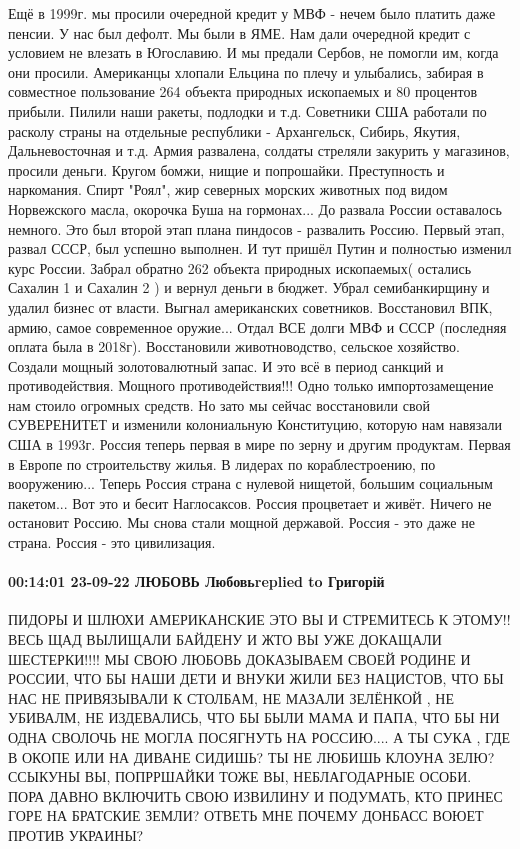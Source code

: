 Ещё в 1999г. мы просили очередной кредит у МВФ - нечем было платить даже пенсии.
У нас был дефолт.
Мы были в ЯМЕ.
Нам дали очередной кредит с условием не влезать в Югославию.
И мы предали Сербов, не помогли им, когда они просили.
Американцы хлопали Ельцина по плечу и улыбались, забирая в совместное пользование 264 объекта природных ископаемых и 80 процентов прибыли. Пилили наши ракеты, подлодки и т.д.
Советники США работали по расколу страны на отдельные республики - Архангельск, Сибирь, Якутия, Дальневосточная и т.д. Армия развалена, солдаты стреляли закурить у магазинов, просили деньги.
Кругом бомжи, нищие и попрошайки. Преступность и наркомания. Спирт "Роял", жир северных морских животных под видом Норвежского масла, окорочка Буша на гормонах...
До развала России оставалось немного.
Это был второй этап плана пиндосов - развалить Россию.
Первый этап, развал СССР, был успешно выполнен.
И тут пришёл Путин и полностью изменил курс России. Забрал обратно 262 объекта природных ископаемых( остались Сахалин 1 и Сахалин 2 ) и вернул деньги в бюджет. Убрал семибанкирщину и удалил бизнес от власти.
Выгнал американских советников.
Восстановил ВПК, армию, самое современное оружие...
Отдал ВСЕ долги МВФ и СССР (последняя оплата была в 2018г). Восстановили животноводство, сельское хозяйство. Создали мощный золотовалютный запас.
И это всё в период санкций и противодействия. Мощного противодействия!!!
Одно только импортозамещение нам стоило огромных средств.
Но зато мы сейчас восстановили свой СУВЕРЕНИТЕТ и изменили колониальную Конституцию, которую нам навязали США в 1993г.
Россия теперь первая в мире по зерну и другим продуктам.
Первая в Европе по строительству жилья.
В лидерах по кораблестроению, по вооружению...
Теперь Россия страна с нулевой нищетой, большим социальным пакетом...
Вот это и бесит Наглосаксов.
Россия процветает и живёт.
Ничего не остановит Россию.
Мы снова стали мощной державой.
Россия - это даже не страна.
Россия - это цивилизация.

\paragraph{00:14:01 23-09-22 ЛЮБОВЬ Любовьreplied to Григорій}

ПИДОРЫ И ШЛЮХИ АМЕРИКАНСКИЕ ЭТО ВЫ И СТРЕМИТЕСЬ К ЭТОМУ!! ВЕСЬ ЩАД ВЫЛИЩАЛИ
БАЙДЕНУ И ЖТО ВЫ УЖЕ ДОКАЩАЛИ ШЕСТЕРКИ!!!! МЫ СВОЮ ЛЮБОВЬ ДОКАЗЫВАЕМ СВОЕЙ
РОДИНЕ И РОССИИ, ЧТО БЫ НАШИ ДЕТИ И ВНУКИ ЖИЛИ БЕЗ НАЦИСТОВ, ЧТО БЫ НАС НЕ
ПРИВЯЗЫВАЛИ К СТОЛБАМ, НЕ МАЗАЛИ ЗЕЛЁНКОЙ , НЕ УБИВАЛМ, НЕ ИЗДЕВАЛИСЬ, ЧТО БЫ
БЫЛИ МАМА И ПАПА, ЧТО БЫ НИ ОДНА СВОЛОЧЬ НЕ МОГЛА ПОСЯГНУТЬ НА РОССИЮ.... А ТЫ
СУКА , ГДЕ В ОКОПЕ ИЛИ НА ДИВАНЕ СИДИШЬ? ТЫ НЕ ЛЮБИШЬ КЛОУНА ЗЕЛЮ? ССЫКУНЫ ВЫ,
ПОПРРШАЙКИ ТОЖЕ ВЫ, НЕБЛАГОДАРНЫЕ ОСОБИ. ПОРА ДАВНО ВКЛЮЧИТЬ СВОЮ ИЗВИЛИНУ И
ПОДУМАТЬ, КТО ПРИНЕС ГОРЕ НА БРАТСКИЕ ЗЕМЛИ? ОТВЕТЬ МНЕ ПОЧЕМУ ДОНБАСС ВОЮЕТ
ПРОТИВ УКРАИНЫ?


